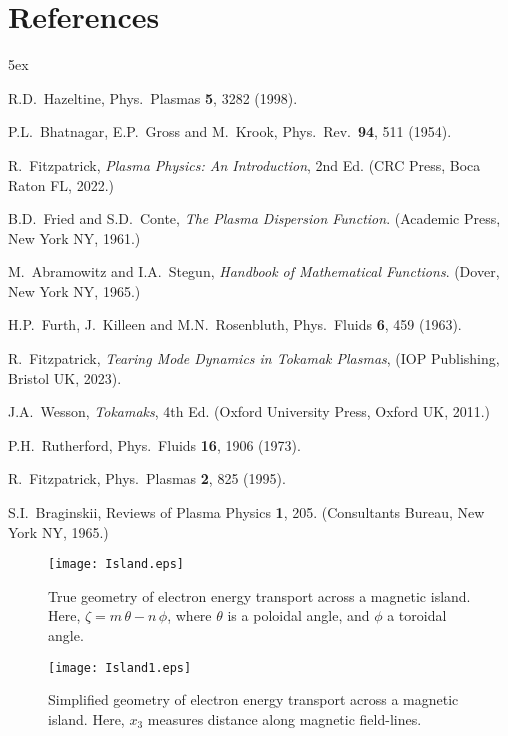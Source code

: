 \documentclass[12pt,prb,aps]{revtex4-1}
\begin{document}
\section*{References}
\begin{thebibliography}{99}\baselineskip 5ex

 R.D.~Hazeltine, Phys.\ Plasmas {\bf 5}, 3282 (1998).

 P.L.~Bhatnagar, E.P.~Gross and M.~Krook, Phys.\ Rev.\ {\bf 94}, 511 (1954).

 R.~Fitzpatrick, {\em Plasma Physics: An Introduction}, 2nd Ed. (CRC Press, Boca Raton FL, 2022.)

 B.D.~Fried and S.D.~Conte, {\em The Plasma Dispersion Function}. (Academic Press, New York NY, 1961.)

 M.~Abramowitz and I.A.~Stegun, {\em Handbook of Mathematical Functions}. (Dover, New York NY, 1965.)

 H.P.~Furth,  J.~Killeen and M.N.~Rosenbluth,  Phys.\ Fluids {\bf 6}, 459 (1963).

 R.~Fitzpatrick, {\em Tearing Mode Dynamics in Tokamak Plasmas}, (IOP Publishing, Bristol UK, 2023).

 J.A.~Wesson, {\em Tokamaks}, 4th Ed. (Oxford University Press, Oxford UK, 2011.)

 P.H.~Rutherford, Phys.\ Fluids {\bf 16}, 1906 (1973).

 R.~Fitzpatrick, Phys.\ Plasmas {\bf 2}, 825 (1995).

 S.I.~Braginskii, Reviews of Plasma Physics {\bf 1}, 205.  (Consultants Bureau, New York NY, 1965.)

\end{thebibliography}

\newpage
\begin{figure}
\centerline{\texttt{[image: Island.eps]}}
\caption{True geometry of electron energy transport across a magnetic island. Here, $\zeta= m\,\theta-n\,\phi$, where $\theta$ is a poloidal angle, and $\phi$ a
toroidal angle.  \label{fig1}}
\end{figure}

\begin{figure}
\centerline{\texttt{[image: Island1.eps]}}
\caption{Simplified geometry of electron energy transport across a magnetic island. Here, $x_3$ measures distance along magnetic field-lines.  \label{fig2}}
\end{figure}
\end{document}
